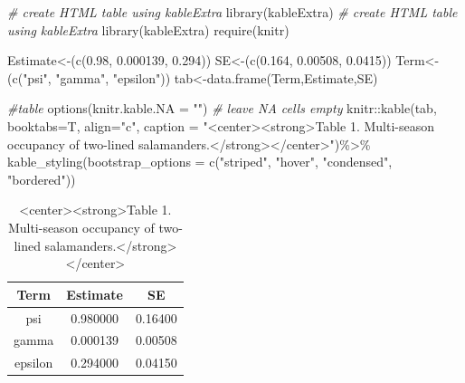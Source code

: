 \documentclass[
]{article}
\newenvironment{Shaded}{\begin{snugshade}}{\end{snugshade}}
\newcommand{\AttributeTok}[1]{\textcolor[rgb]{0.77,0.63,0.00}{#1}}
\newcommand{\CommentTok}[1]{\textcolor[rgb]{0.56,0.35,0.01}{\textit{#1}}}
\newcommand{\FloatTok}[1]{\textcolor[rgb]{0.00,0.00,0.81}{#1}}
\newcommand{\FunctionTok}[1]{\textcolor[rgb]{0.00,0.00,0.00}{#1}}
\newcommand{\NormalTok}[1]{#1}
\newcommand{\OtherTok}[1]{\textcolor[rgb]{0.56,0.35,0.01}{#1}}
\newcommand{\SpecialCharTok}[1]{\textcolor[rgb]{0.00,0.00,0.00}{#1}}
\newcommand{\StringTok}[1]{\textcolor[rgb]{0.31,0.60,0.02}{#1}}
\begin{document}
\begin{Shaded}
\begin{Highlighting}[]
\CommentTok{\# create HTML table using kableExtra}
\FunctionTok{library}\NormalTok{(kableExtra)}
\CommentTok{\# create HTML table using kableExtra}
\FunctionTok{library}\NormalTok{(kableExtra)}
\FunctionTok{require}\NormalTok{(knitr)}

\NormalTok{Estimate}\OtherTok{\textless{}{-}}\NormalTok{(}\FunctionTok{c}\NormalTok{(}\FloatTok{0.98}\NormalTok{, }\FloatTok{0.000139}\NormalTok{, }\FloatTok{0.294}\NormalTok{))}
\NormalTok{SE}\OtherTok{\textless{}{-}}\NormalTok{(}\FunctionTok{c}\NormalTok{(}\FloatTok{0.164}\NormalTok{, }\FloatTok{0.00508}\NormalTok{, }\FloatTok{0.0415}\NormalTok{))}
\NormalTok{Term}\OtherTok{\textless{}{-}}\NormalTok{(}\FunctionTok{c}\NormalTok{(}\StringTok{"psi"}\NormalTok{, }\StringTok{"gamma"}\NormalTok{, }\StringTok{"epsilon"}\NormalTok{))}
\NormalTok{tab}\OtherTok{\textless{}{-}}\FunctionTok{data.frame}\NormalTok{(Term,Estimate,SE)}


\CommentTok{\#table }
\FunctionTok{options}\NormalTok{(}\AttributeTok{knitr.kable.NA =} \StringTok{""}\NormalTok{) }\CommentTok{\# leave NA cells empty}
\NormalTok{knitr}\SpecialCharTok{::}\FunctionTok{kable}\NormalTok{(tab, }\AttributeTok{booktabs=}\NormalTok{T, }\AttributeTok{align=}\StringTok{"c"}\NormalTok{,}
       \AttributeTok{caption =} \StringTok{"\textless{}center\textgreater{}\textless{}strong\textgreater{}Table 1. Multi{-}season occupancy of two{-}lined salamanders.\textless{}/strong\textgreater{}\textless{}/center\textgreater{}"}\NormalTok{)}\SpecialCharTok{\%\textgreater{}\%}
  \FunctionTok{kable\_styling}\NormalTok{(}\AttributeTok{bootstrap\_options =} \FunctionTok{c}\NormalTok{(}\StringTok{"striped"}\NormalTok{, }\StringTok{"hover"}\NormalTok{, }\StringTok{"condensed"}\NormalTok{, }\StringTok{"bordered"}\NormalTok{))}
\end{Highlighting}
\end{Shaded}

\begin{table}

\caption{\label{tab:table1}<center><strong>Table 1. Multi-season occupancy of two-lined salamanders.</strong></center>}
\centering
\begin{tabular}[t]{ccc}
\toprule
Term & Estimate & SE\\
\midrule
psi & 0.980000 & 0.16400\\
gamma & 0.000139 & 0.00508\\
epsilon & 0.294000 & 0.04150\\
\bottomrule
\end{tabular}
\end{table}
\end{document}
